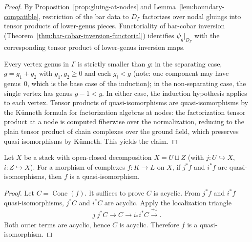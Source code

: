 \begin{proof}
By Proposition~\ref{prop:gluing-at-nodes} and
Lemma~\ref{lem:boundary-compatible}, restriction of the bar data to $D_\Gamma$
factorizes over nodal gluings into tensor products of lower-genus pieces.
Functoriality of bar-cobar inversion
(Theorem~\ref{thm:bar-cobar-inversion-functorial}) identifies
$\psi_g|_{D_\Gamma}$ with the corresponding tensor product of lower-genus inversion maps.

Every vertex genus in $\Gamma$ is strictly smaller than $g$: in the separating case,
$g=g_1+g_2$ with $g_1,g_2 \geq 0$ and each $g_i < g$ (note: one component may have genus~$0$, which is the base case of the induction); in the non-separating case, the single vertex has genus $g-1 < g$. In either case, the induction hypothesis applies to each vertex. Tensor products of quasi-isomorphisms
are quasi-isomorphisms by the K\"unneth formula for factorization
algebras at nodes: the factorization tensor product at a node is
computed fiberwise over the normalization, reducing to the plain
tensor product of chain complexes over the ground field, which
preserves quasi-isomorphisms by K\"unneth. This yields the claim.
\end{proof}

\begin{lemma}\label{lem:extension-across-boundary-qi}
Let $X$ be a stack with open-closed decomposition $X = U \sqcup Z$ (with
$j:U\hookrightarrow X$, $i:Z\hookrightarrow X$). For a morphism of complexes
$f:K\to L$ on $X$, if $j^*f$ and $i^*f$ are quasi-isomorphisms, then $f$ is a
quasi-isomorphism.
\end{lemma}

\begin{proof}
Let $C=\operatorname{Cone}(f)$. It suffices to prove $C$ is acyclic.
From $j^*f$ and $i^*f$ quasi-isomorphisms, $j^*C$ and $i^*C$ are acyclic.
Apply the localization triangle
\[j_!j^*C \longrightarrow C \longrightarrow i_*i^*C \xrightarrow{+1}.\]
Both outer terms are acyclic, hence $C$ is acyclic. Therefore $f$ is a
quasi-isomorphism.
\end{proof}

